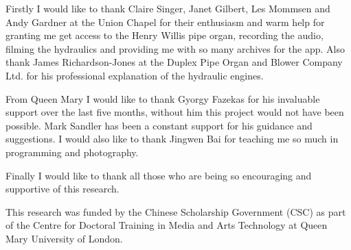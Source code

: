 
Firstly I would like to thank Claire Singer, Janet Gilbert, Les Mommsen and Andy Gardner at the Union Chapel for their enthusiasm and warm help for granting me get access to the Henry Willis pipe organ, recording the audio, filming the hydraulics and providing me with so many archives for the app. Also thank James Richardson-Jones at the Duplex Pipe Organ and Blower Company Ltd. for his professional explanation of the hydraulic engines. 

From Queen Mary I would like to thank Gyorgy Fazekas for his invaluable support over the last five months, without him this project would not have been possible. Mark Sandler has been a constant support for his guidance and suggestions. I would also like to thank Jingwen Bai for teaching me so much in programming and photography.

Finally I would like to thank all those who are being so encouraging and supportive of this research.

This research was funded by the Chinese Scholarship Government (CSC) as part of the Centre for Doctoral Training in Media and Arts Technology at Queen Mary University of London.


